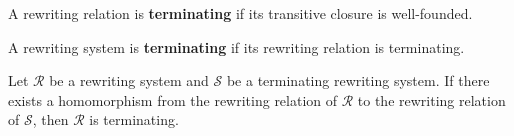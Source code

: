       
    \begin{definition}
        \label{def:rewriting_relation:termination}
    A rewriting relation is \textbf{terminating} if its transitive closure is well-founded.
    \end{definition}
    
    \begin{definition}
        \label{def:rewriting_system:termination}
        A rewriting system 
         is \textbf{terminating} if its rewriting relation
          is terminating.
    \end{definition}
    
    \begin{proposition}
        Let $\mathcal{R}$ be a rewriting system and $\mathcal{S}$ be a terminating rewriting system.
        If there exists a homomorphism from the rewriting relation of $\mathcal{R}$ to the rewriting relation of $\mathcal{S}$, then $\mathcal{R}$ is terminating.  
    \end{proposition}
    
